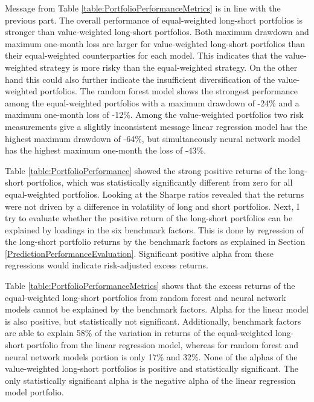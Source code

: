 \documentclass[12pt]{article}
\begin{document}
Message from Table \ref{table:PortfolioPerformanceMetrics} is in line with the previous part. The overall performance of equal-weighted long-short portfolios is stronger than value-weighted long-short portfolios. Both maximum drawdown and maximum one-month loss are larger for value-weighted long-short portfolios than their equal-weighted counterparties for each model. This indicates that the value-weighted strategy is more risky than the equal-weighted strategy. On the other hand this could also further indicate the insufficient diversification of the value-weighted portfolios. The random forest model shows the strongest performance among the equal-weighted portfolios with a maximum drawdown of -24\% and a maximum one-month loss of -12\%. Among the value-weighted portfolios two risk measurements give a slightly inconsistent message linear regression model has the highest maximum drawdown of -64\%, but simultaneously neural network model has the highest maximum one-month the loss of -43\%. \par

Table \ref{table:PortfolioPerformance} showed the strong positive returns of the long-short portfolios, which was statistically significantly different from zero for all equal-weighted portfolios. Looking at the Sharpe ratios revealed that the returns were not driven by a difference in volatility of long and short portfolios. Next, I try to evaluate whether the positive return of the long-short portfolios can be explained by loadings in the six benchmark factors. This is done by regression of the long-short portfolio returns by the benchmark factors as explained in Section \ref{PredictionPerformanceEvaluation}. Significant positive alpha from these regressions would indicate risk-adjusted excess returns. \par

Table \ref{table:PortfolioPerformanceMetrics} shows that the excess returns of the equal-weighted long-short portfolios from random forest and neural network models cannot be explained by the benchmark factors. Alpha for the linear model is also positive, but statistically not significant. Additionally, benchmark factors are able to explain 58\% of the variation in returns of the equal-weighted long-short portfolio from the linear regression model, whereas for random forest and neural network models portion is only 17\% and 32\%. None of the alphas of the value-weighted long-short portfolios is positive and statistically significant. The only statistically significant alpha is the negative alpha of the linear regression model portfolio. \par
\end{document}
